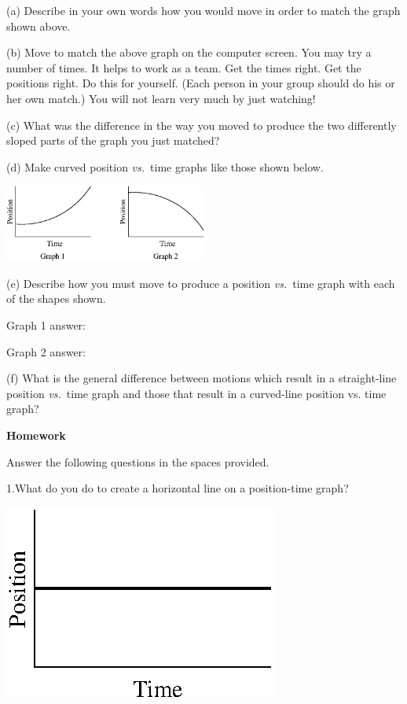 (a) Describe in your own words how you would move in order to match the graph
shown above.
\answerspace{15mm}

(b) Move to match the above graph on the computer screen. You may try a number
of times. It helps to work as a team. Get the times right. Get the positions
right. Do this for yourself. (Each person in your group should do his or her
own match.) You will not learn very much by just watching!

(c) What was the difference in the way you moved to produce the two differently
sloped parts of the graph you just matched?
\answerspace{15mm}

(d) Make curved position \textit{vs.}~time graphs like those shown below.

\vspace{0.3cm}
{\par\centering \includegraphics[width=0.5\textwidth]{position/position_fig4.eps} \par}
\vspace{-0.1cm}

(e) Describe how you must move to produce a position \textit{vs.}~time graph with each
of the shapes shown.

Graph 1 answer:
\answerspace{10mm}

Graph 2 answer:
\answerspace{10mm}

(f) What is the general difference between motions which result in a straight-line
position \textit{vs.}~time graph and those that result in a curved-line position vs.
time graph?
\answerspace{20mm}

\pagebreak[2]
\textbf{Homework} 

Answer the following questions in the spaces provided.

1.What do you do to create a horizontal line on a position-time graph?

\vspace{0.3cm}
{\par\raggedright \includegraphics{position/position_fig5.eps} \par}
\vspace{0.3cm}

